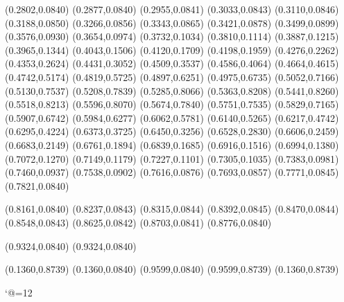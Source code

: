 \PST@Solid(0.2802,0.0840)
(0.2877,0.0840)
(0.2955,0.0841)
(0.3033,0.0843)
(0.3110,0.0846)
(0.3188,0.0850)
(0.3266,0.0856)
(0.3343,0.0865)
(0.3421,0.0878)
(0.3499,0.0899)
(0.3576,0.0930)
(0.3654,0.0974)
(0.3732,0.1034)
(0.3810,0.1114)
(0.3887,0.1215)
(0.3965,0.1344)
(0.4043,0.1506)
(0.4120,0.1709)
(0.4198,0.1959)
(0.4276,0.2262)
(0.4353,0.2624)
(0.4431,0.3052)
(0.4509,0.3537)
(0.4586,0.4064)
(0.4664,0.4615)
(0.4742,0.5174)
(0.4819,0.5725)
(0.4897,0.6251)
(0.4975,0.6735)
(0.5052,0.7166)
(0.5130,0.7537)
(0.5208,0.7839)
(0.5285,0.8066)
(0.5363,0.8208)
(0.5441,0.8260)
(0.5518,0.8213)
(0.5596,0.8070)
(0.5674,0.7840)
(0.5751,0.7535)
(0.5829,0.7165)
(0.5907,0.6742)
(0.5984,0.6277)
(0.6062,0.5781)
(0.6140,0.5265)
(0.6217,0.4742)
(0.6295,0.4224)
(0.6373,0.3725)
(0.6450,0.3256)
(0.6528,0.2830)
(0.6606,0.2459)
(0.6683,0.2149)
(0.6761,0.1894)
(0.6839,0.1685)
(0.6916,0.1516)
(0.6994,0.1380)
(0.7072,0.1270)
(0.7149,0.1179)
(0.7227,0.1101)
(0.7305,0.1035)
(0.7383,0.0981)
(0.7460,0.0937)
(0.7538,0.0902)
(0.7616,0.0876)
(0.7693,0.0857)
(0.7771,0.0845)
(0.7821,0.0840)

\PST@Solid(0.8161,0.0840)
(0.8237,0.0843)
(0.8315,0.0844)
(0.8392,0.0845)
(0.8470,0.0844)
(0.8548,0.0843)
(0.8625,0.0842)
(0.8703,0.0841)
(0.8776,0.0840)

\PST@Solid(0.9324,0.0840)
(0.9324,0.0840)

\PST@Border(0.1360,0.8739)
(0.1360,0.0840)
(0.9599,0.0840)
(0.9599,0.8739)
(0.1360,0.8739)

\catcode`@=12
\fi
\endpspicture
